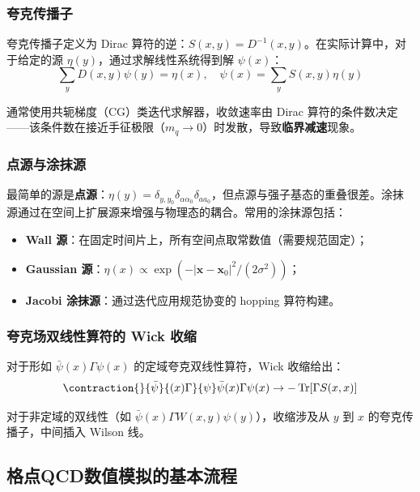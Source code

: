 \documentclass[11pt,a4paper]{ctexart}
\newcommand{\tr}{\operatorname{Tr}}
\begin{document}
\subsubsection{夸克传播子}

夸克传播子定义为 Dirac 算符的逆：$S(x,y) = D^{-1}(x,y)$。在实际计算中，对于给定的源 $\eta(y)$，通过求解线性系统得到解 $\psi(x)$：
\begin{equation}
\sum_y D(x,y) \psi(y) = \eta(x), \quad \psi(x) = \sum_y S(x,y) \eta(y)
\end{equation}

通常使用共轭梯度（CG）类迭代求解器，收敛速率由 Dirac 算符的条件数决定——该条件数在接近手征极限（$m_q \to 0$）时发散，导致\textbf{临界减速}现象。

\subsubsection{点源与涂抹源}

最简单的源是\textbf{点源}：$\eta(y) = \delta_{y,y_0} \delta_{\alpha\alpha_0} \delta_{aa_0}$，但点源与强子基态的重叠很差。涂抹源通过在空间上扩展源来增强与物理态的耦合。常用的涂抹源包括：
\begin{itemize}
  \item \textbf{Wall 源}：在固定时间片上，所有空间点取常数值（需要规范固定）；
  \item \textbf{Gaussian 源}：$\eta(x) \propto \exp(-|\mathbf{x} - \mathbf{x}_0|^2 / (2\sigma^2))$；
  \item \textbf{Jacobi 涂抹源}：通过迭代应用规范协变的 hopping 算符构建。
\end{itemize}

\subsubsection{夸克场双线性算符的 Wick 收缩}

对于形如 $\bar{\psi}(x) \Gamma \psi(x)$ 的定域夸克双线性算符，Wick 收缩给出：
\begin{equation}
\contraction{}{\bar{\psi}}{(x) \Gamma}{\psi}
\bar{\psi}(x) \Gamma \psi(x) \to -\tr[\Gamma S(x,x)]
\end{equation}

对于非定域的双线性（如 $\bar{\psi}(x) \Gamma W(x,y) \psi(y)$），收缩涉及从 $y$ 到 $x$ 的夸克传播子，中间插入 Wilson 线。

\subsection{格点QCD数值模拟的基本流程}
\end{document}
